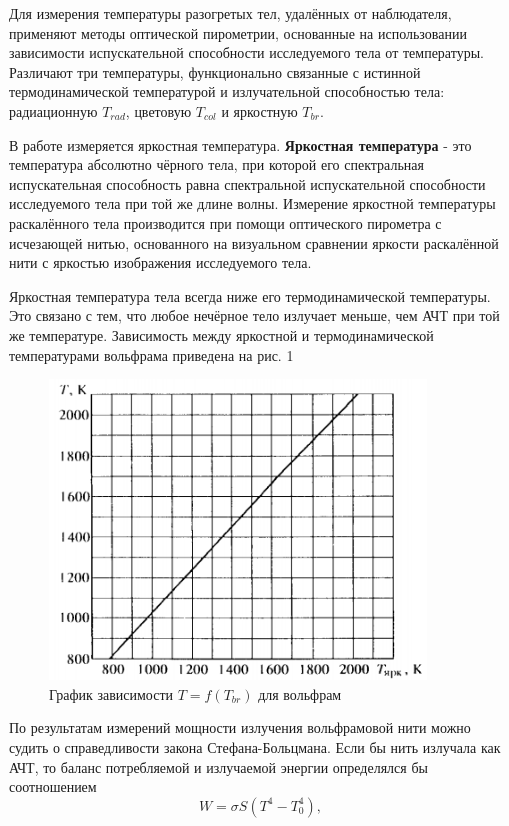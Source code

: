 \documentclass[a4paper,12pt]{article} %
\begin{document}
		Для измерения температуры разогретых тел, удалённых от наблюдателя, применяют методы оптической пирометрии, основанные на использовании зависимости испускательной способности исследуемого тела от температуры. Различают три температуры, функционально связанные с истинной термодинамической температурой и излучательной способностью тела: радиационную $T_{rad}$, цветовую $T_{col}$ и яркостную $T_{br}$. \par
		В работе измеряется яркостная температура. \textbf{Яркостная температура} - это температура абсолютно чёрного тела, при которой его спектральная испускательная способность равна спектральной испускательной способности исследуемого тела при той же длине волны.
		Измерение яркостной температуры раскалённого тела производится при помощи оптического пирометра с исчезающей нитью, основанного на визуальном сравнении яркости раскалённой нити с яркостью изображения исследуемого тела. \par
		Яркостная температура тела всегда ниже его термодинамической температуры. Это связано с тем, что любое нечёрное тело излучает меньше, чем АЧТ при той же температуре. Зависимость между яркостной и термодинамической температурами вольфрама приведена на рис. 1
		\begin{figure}[h]
			\centering
			\includegraphics[width=10cm]{img/fig2.PNG}
			\caption{График зависимости $T = f(T_{br})$ для вольфрам}
			\label{ris:fig1}
		\end{figure}
		По результатам измерений мощности излучения вольфрамовой нити можно судить о справедливости закона Стефана-Больцмана. Если бы нить излучала как АЧТ, то баланс потребляемой и излучаемой энергии определялся бы соотношением 
		\begin{equation}
			W = \sigma S (T^4 - T_0^4),
		\end{equation}
\end{document}
